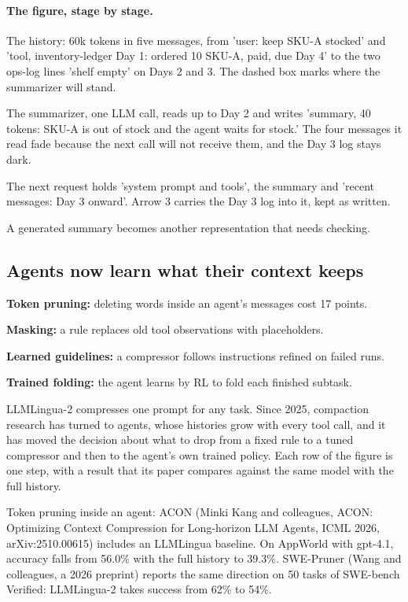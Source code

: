 \paragraph{The figure, stage by stage.}
\be
\item The history: 60k tokens in five messages, from 'user: keep SKU-A stocked' and 'tool, inventory-ledger Day 1: ordered 10 SKU-A, paid, due Day 4' to the two ops-log lines 'shelf empty' on Days 2 and 3. The dashed box marks where the summarizer will stand.
\item The summarizer, one LLM call, reads up to Day 2 and writes 'summary, 40 tokens: SKU-A is out of stock and the agent waits for stock.' The four messages it read fade because the next call will not receive them, and the Day 3 log stays dark.
\item The next request holds 'system prompt and tools', the summary and 'recent messages: Day 3 onward'. Arrow 3 carries the Day 3 log into it, kept as written.
\ee

\begin{takeaway}A generated summary becomes another representation that needs checking.\end{takeaway}

\subsection{Agents now learn what their context keeps}
\label{sec:it-7-3b}

\bi
\item \textbf{Token pruning:} deleting words inside an agent's messages cost 17 points.
\item \textbf{Masking:} a rule replaces old tool observations with placeholders.
\item \textbf{Learned guidelines:} a compressor follows instructions refined on failed runs.
\item \textbf{Trained folding:} the agent learns by RL to fold each finished subtask.
\ei

LLMLingua-2 compresses one prompt for any task. Since 2025, compaction research has turned to agents, whose histories grow with every tool call, and it has moved the decision about what to drop from a fixed rule to a tuned compressor and then to the agent's own trained policy. Each row of the figure is one step, with a result that its paper compares against the same model with the full history.

Token pruning inside an agent: ACON (Minki Kang and colleagues, ACON: Optimizing Context Compression for Long-horizon LLM Agents, ICML 2026, arXiv:2510.00615) includes an LLMLingua baseline. On AppWorld with gpt-4.1, accuracy falls from 56.0\% with the full history to 39.3\%. SWE-Pruner (Wang and colleagues, a 2026 preprint) reports the same direction on 50 tasks of SWE-bench Verified: LLMLingua-2 takes success from 62\% to 54\%.

